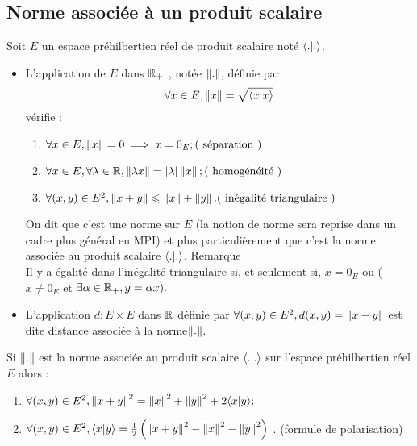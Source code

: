 \subsection{Norme associée à un produit scalaire}
Soit \(E\) un espace préhilbertien réel de produit scalaire noté \(\langle . | . \rangle\).
\begin{defprop}
    \begin{itemize}
    \item L’application de \(E\) dans \(\mathbb{R}_+\) , notée \(\left\|.\right\|\), définie par
        \[\forall x \in E, \left\|x\right\| = \sqrt{\langle x | x \rangle}\]
    vérifie :
    \begin{enumerate}
        \item\( \forall x \in E, \norme{x} = 0 \imp x = 0_E ; \hfill( \text{ séparation })\)
        \item\( \forall x \in E, \forall \lambda  \in \R, \norme{\lambda x} = \abs{\lambda } \norme{x} ;\hfill (\text{ homogénéité })\)
        \item\( \forall (x, y) \in E^2, \norme{x +y} \leq \norme{x} + \norme{y} . \hfill(\text{ inégalité triangulaire })\)
    \end{enumerate}
    On dit que c’est une norme sur \(E\) (la notion de norme sera reprise dans un cadre plus général en MPI) et plus particulièrement que c’est la norme associée au produit scalaire \(\langle . | . \rangle\).
    \underline{Remarque}\\
    Il y a égalité dans l’inégalité triangulaire si, et seulement si, \(x = 0_E\) ou (\(x\neq 0_E\) et \(\exists \alpha \in \mathbb{R}_+, y = \alpha x).\)
    \item L’application \(d : E \times E\) dans \(\mathbb{R}\) définie par \(\forall (x, y) \in E^2, d(x, y) = \left\|x-y\right\|\) est dite distance associée à la norme\( \left\|.\right\|\).
\end{itemize}
\end{defprop}
\begin{defprop}
    Si \(\left\|.\right\|\) est la norme associée au produit scalaire \(\langle . | . \rangle\) sur l’espace préhilbertien réel \(E\) alors :
    \begin{enumerate}
        \item \( \forall (x, y) \in E^2, \left\|x +y \right\|^2 = \left\|x\right\|^2 + \left\|y\right\|^2 + 2 \langle x | y \rangle ;\)
        \item \( \forall (x, y) \in E^2, \langle x | y \rangle = \frac{1}{2}\left(\left\|x +y\right\|^2 - \left\|x\right\|^2 - \left\|y\right\|^2\right)\) . \hfill (formule de polarisation)
    \end{enumerate}
\end{defprop}

